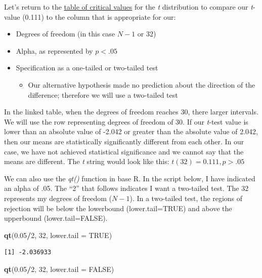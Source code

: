 \documentclass[
  11pt,
]{book}
\newenvironment{Shaded}{\begin{snugshade}}{\end{snugshade}}
\newcommand{\AttributeTok}[1]{\textcolor[rgb]{0.27,0.27,0.27}{#1}}
\newcommand{\ConstantTok}[1]{\textcolor[rgb]{0.37,0.37,0.37}{#1}}
\newcommand{\DecValTok}[1]{\textcolor[rgb]{0.06,0.06,0.06}{#1}}
\newcommand{\FloatTok}[1]{\textcolor[rgb]{0.06,0.06,0.06}{#1}}
\newcommand{\FunctionTok}[1]{\textcolor[rgb]{0.27,0.27,0.27}{\textbf{#1}}}
\newcommand{\NormalTok}[1]{#1}
\newcommand{\SpecialCharTok}[1]{\textcolor[rgb]{0.43,0.43,0.43}{\textbf{#1}}}
\providecommand{\tightlist}{%
  \setlength{\itemsep}{0pt}\setlength{\parskip}{0pt}}
\begin{document}
Let's return to the \href{https://www.statology.org/t-distribution-table/}{table of critical values} for the \emph{t} distribution to compare our \emph{t}-value (0.111) to the column that is appropriate for our:

\begin{itemize}
\tightlist
\item
  Degrees of freedom (in this case \(N-1\) or 32)
\item
  Alpha, as represented by \(p < .05\)
\item
  Specification as a one-tailed or two-tailed test

  \begin{itemize}
  \tightlist
  \item
    Our alternative hypothesis made no prediction about the direction of the difference; therefore we will use a two-tailed test
  \end{itemize}
\end{itemize}

In the linked table, when the degrees of freedom reaches 30, there larger intervals. We will use the row representing degrees of freedom of 30. If our \emph{t}-test value is lower than an absolute value of -2.042 or greater than the absolute value of 2.042, then our means are statistically significantly different from each other. In our case, we have not achieved statistical significance and we cannot say that the means are different. The \emph{t} string would look like this: \(t(32) = 0.111, p > .05\)

We can also use the \emph{qt()} function in base R. In the script below, I have indicated an alpha of .05. The ``2'' that follows indicates I want a two-tailed test. The 32 represents my degrees of freedom (\(N-1\)). In a two-tailed test, the regions of rejection will be below the lowerbound (lower.tail=TRUE) and above the upperbound (lower.tail=FALSE).

\begin{Shaded}
\begin{Highlighting}[]
\FunctionTok{qt}\NormalTok{(}\FloatTok{0.05}\SpecialCharTok{/}\DecValTok{2}\NormalTok{, }\DecValTok{32}\NormalTok{, }\AttributeTok{lower.tail =} \ConstantTok{TRUE}\NormalTok{)}
\end{Highlighting}
\end{Shaded}

\begin{verbatim}
[1] -2.036933
\end{verbatim}

\begin{Shaded}
\begin{Highlighting}[]
\FunctionTok{qt}\NormalTok{(}\FloatTok{0.05}\SpecialCharTok{/}\DecValTok{2}\NormalTok{, }\DecValTok{32}\NormalTok{, }\AttributeTok{lower.tail =} \ConstantTok{FALSE}\NormalTok{)}
\end{Highlighting}
\end{Shaded}
\end{document}
